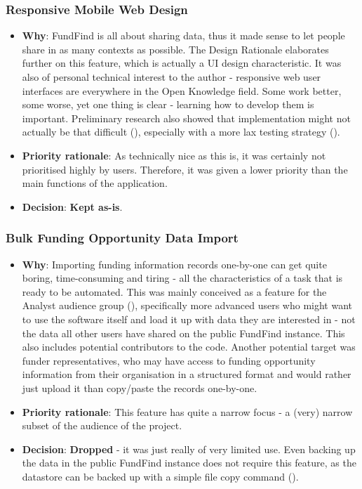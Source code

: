 \subsubsection{Responsive Mobile Web Design}
\begin{itemize}
 \item \textbf{Why}: FundFind is all about sharing data, thus it made sense to let people share in as many contexts as possible. The Design Rationale  elaborates further on this feature, which is actually a UI design characteristic. It was also of personal technical interest to the author - responsive web user interfaces are everywhere in the Open Knowledge field. Some work better, some worse, yet one thing is clear - learning how to develop them is important. Preliminary research also showed that implementation might not actually be that difficult (), especially with a more lax testing strategy ().
 \item \textbf{Priority rationale}: As technically nice as this is, it was certainly not prioritised highly by users. Therefore, it was given a lower priority than the main functions of the application.
 \item \textbf{Decision}: \textbf{Kept as-is}.
\end{itemize}

\subsubsection{Bulk Funding Opportunity Data Import}
\begin{itemize}
 \item \textbf{Why}: Importing funding information records one-by-one can get quite boring, time-consuming and tiring - all the characteristics of a task that is ready to be automated. This was mainly conceived as a feature for the Analyst audience group (), specifically more advanced users who might want to use the software itself and load it up with data they are interested in - not the data all other users have shared on the public FundFind instance. This also includes potential contributors to the code. Another potential target was funder representatives, who may have access to funding opportunity information from their organisation in a structured format and would rather just upload it than copy/paste the records one-by-one.
 \item \textbf{Priority rationale}: This feature has quite a narrow focus - a (very) narrow subset of the audience of the project.
 \item \textbf{Decision}: \textbf{Dropped} - it was just really of very limited use. Even backing up the data in the public FundFind instance does not require this feature, as the datastore can be backed up with a simple file copy command ().
\end{itemize}

